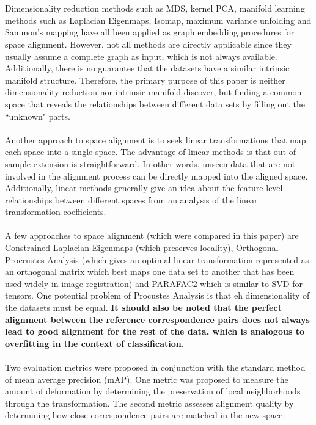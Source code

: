 \documentclass[]{article}
\begin{document}
		\\ \\
		Dimensionality reduction methods such as MDS, kernel PCA, manifold learning methods such as Laplacian Eigenmaps, Isomap, maximum variance unfolding and Sammon's mapping have all been applied as graph embedding procedures for space alignment.  However, not all methods are directly applicable since they usually assume a complete graph as input, which is not always available.  Additionally, there is no guarantee that the datasets have a similar intrinsic manifold structure.  Therefore, the primary purpose of this paper is neither dimensionality reduction nor intrinsic manifold discover, but finding a common space that reveals the relationships between different data sets by filling out the ``unknown" parts.
		\\ \\
		Another approach to space alignment is to seek linear transformations that map each space into a single space.  The advantage of linear methods is that out-of-sample  extension is straightforward. In other words, unseen data that are not involved in the alignment process can be directly mapped into the aligned space.  Additionally, linear methods generally give an idea about the feature-level relationships between different spaces from an analysis of the linear transformation coefficients.
		\\ \\
		A few approaches to space alignment (which were compared in this paper) are Constrained Laplacian Eigenmaps (which preserves locality), Orthogonal Procrustes Analysis (which gives an optimal linear transformation represented as an orthogonal matrix which best maps one data set to another that has been used widely in image registration) and PARAFAC2 which is similar to SVD for tensors.  One potential problem of Procustes Analysis is that eh dimensionality of the datasets must be equal.  \textbf{It should also be noted that the perfect alignment between the reference correspondence pairs does not always lead to good alignment for the rest of the data, which is analogous to overfitting in the context of classification.}
		\\ \\
		Two evaluation metrics were proposed in conjunction with the standard method of mean average precision (mAP).  One metric was proposed to measure the amount of deformation by determining the preservation of local neighborhoods through the transformation.  The second metric assesses alignment quality by determining how close correspondence pairs are matched in the new space.
		\\ \\
		
\end{document}
